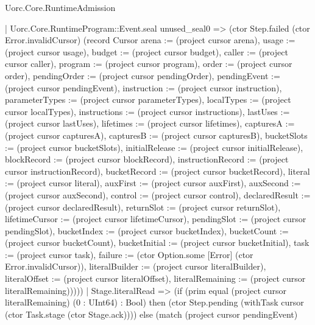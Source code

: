 \begin{lexlean}{Uorc.Core.RuntimeAdmission}
\begin{semanticmodule}
{          | Uorc.Core.RuntimeProgram::Event.seal unused_seal0 => (ctor Step.failed (ctor Error.invalidCursor) (record Cursor {arena := (project cursor arena), usage := (project cursor usage), budget := (project cursor budget), caller := (project cursor caller), program := (project cursor program), order := (project cursor order), pendingOrder := (project cursor pendingOrder), pendingEvent := (project cursor pendingEvent), instruction := (project cursor instruction), parameterTypes := (project cursor parameterTypes), localTypes := (project cursor localTypes), instructions := (project cursor instructions), lastUses := (project cursor lastUses), lifetimes := (project cursor lifetimes), capturesA := (project cursor capturesA), capturesB := (project cursor capturesB), bucketSlots := (project cursor bucketSlots), initialRelease := (project cursor initialRelease), blockRecord := (project cursor blockRecord), instructionRecord := (project cursor instructionRecord), bucketRecord := (project cursor bucketRecord), literal := (project cursor literal), auxFirst := (project cursor auxFirst), auxSecond := (project cursor auxSecond), control := (project cursor control), declaredResult := (project cursor declaredResult), returnSlot := (project cursor returnSlot), lifetimeCursor := (project cursor lifetimeCursor), pendingSlot := (project cursor pendingSlot), bucketIndex := (project cursor bucketIndex), bucketCount := (project cursor bucketCount), bucketInitial := (project cursor bucketInitial), task := (project cursor task), failure := (ctor Option.some [Error] (ctor Error.invalidCursor)), literalBuilder := (project cursor literalBuilder), literalOffset := (project cursor literalOffset), literalRemaining := (project cursor literalRemaining)}))))
      | Stage.literalRead => (if (prim equal (project cursor literalRemaining) (0 : UInt64) : Bool) then (ctor Step.pending (withTask cursor (ctor Task.stage (ctor Stage.ack)))) else (match (project cursor pendingEvent)
}
\end{semanticmodule}
\end{lexlean}
